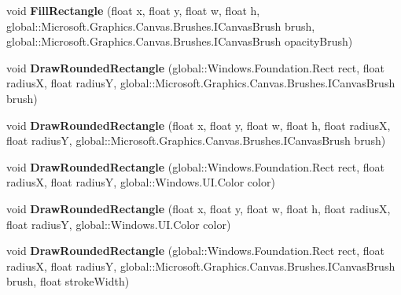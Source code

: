 \begin{DoxyCompactItemize}
void {\bfseries Fill\+Rectangle} (float x, float y, float w, float h, global\+::\+Microsoft.\+Graphics.\+Canvas.\+Brushes.\+I\+Canvas\+Brush brush, global\+::\+Microsoft.\+Graphics.\+Canvas.\+Brushes.\+I\+Canvas\+Brush opacity\+Brush)
\item 
\mbox{\label{class_microsoft_1_1_graphics_1_1_canvas_1_1_canvas_drawing_session_a1644619e4f8a2a59e186364cbac40657}} 
void {\bfseries Draw\+Rounded\+Rectangle} (global\+::\+Windows.\+Foundation.\+Rect rect, float radiusX, float radiusY, global\+::\+Microsoft.\+Graphics.\+Canvas.\+Brushes.\+I\+Canvas\+Brush brush)
\item 
\mbox{\label{class_microsoft_1_1_graphics_1_1_canvas_1_1_canvas_drawing_session_abf45229c504fd79de125759c0a2d40ac}} 
void {\bfseries Draw\+Rounded\+Rectangle} (float x, float y, float w, float h, float radiusX, float radiusY, global\+::\+Microsoft.\+Graphics.\+Canvas.\+Brushes.\+I\+Canvas\+Brush brush)
\item 
\mbox{\label{class_microsoft_1_1_graphics_1_1_canvas_1_1_canvas_drawing_session_ad0090a1bc18862831736335ce44c8ebb}} 
void {\bfseries Draw\+Rounded\+Rectangle} (global\+::\+Windows.\+Foundation.\+Rect rect, float radiusX, float radiusY, global\+::\+Windows.\+U\+I.\+Color color)
\item 
\mbox{\label{class_microsoft_1_1_graphics_1_1_canvas_1_1_canvas_drawing_session_a4796822b098305408fa7a331119d16b6}} 
void {\bfseries Draw\+Rounded\+Rectangle} (float x, float y, float w, float h, float radiusX, float radiusY, global\+::\+Windows.\+U\+I.\+Color color)
\item 
\mbox{\label{class_microsoft_1_1_graphics_1_1_canvas_1_1_canvas_drawing_session_aecf1fc7b87f19919d0da566e2c11637b}} 
void {\bfseries Draw\+Rounded\+Rectangle} (global\+::\+Windows.\+Foundation.\+Rect rect, float radiusX, float radiusY, global\+::\+Microsoft.\+Graphics.\+Canvas.\+Brushes.\+I\+Canvas\+Brush brush, float stroke\+Width)
\item 
\mbox{\label{class_microsoft_1_1_graphics_1_1_canvas_1_1_canvas_drawing_session_a144caad7726c38792ffdc994862564d2}} 

\end{DoxyCompactItemize}
